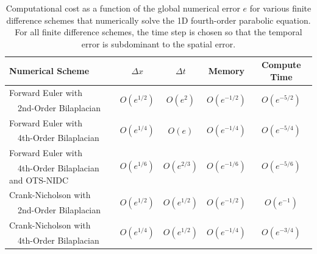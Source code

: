 \documentclass[fleqn,12pt,twoside]{article}
\def\dt{\Delta t}
\def\dx{\Delta x}
\begin{document}
\begin{table}[tb]
\caption{
Computational cost as a function of the global numerical error $e$
for various finite difference schemes that numerically solve the 1D 
fourth-order parabolic equation.  For all finite difference schemes, the 
time step is chosen so that the temporal error is subdominant to the spatial
error.
}
\label{tab:comp_perf_vs_err_4th_order_parabolic} 
\renewcommand{\arraystretch}{1.3}
\centering
\begin{tabular}{lcccc}
  \hline
  {\bf Numerical Scheme} & $\dx$ 
  & $\dt$
  & {\bf Memory}
  & {\bf Compute Time}
  \\
  \hline 
  Forward Euler with 
    & \multirow{2}{*}{$O\left( e^{1/2} \right)$} 
    & \multirow{2}{*}{$O\left( e^{2} \right)$}
    & \multirow{2}{*}{$O\left( e^{-1/2} \right)$} 
    & \multirow{2}{*}{$O\left( e^{-5/2} \right)$} \\
  \ \ 2nd-Order Bilaplacian & & & & \\
  Forward Euler with 
    & \multirow{2}{*}{$O\left( e^{1/4} \right)$}
    & \multirow{2}{*}{$O\left( e \right)$}
    & \multirow{2}{*}{$O\left( e^{-1/4} \right)$} 
    & \multirow{2}{*}{$O\left( e^{-{5/4}} \right)$} \\
  \ \ 4th-Order Bilaplacian & & & & \\
  Forward Euler with 
    & \multirow{2}{*}{$O\left( e^{1/6} \right)$} 
    & \multirow{2}{*}{$O\left( e^{2/3} \right)$} 
    & \multirow{2}{*}{$O\left( e^{-1/6} \right)$} 
    & \multirow{2}{*}{$O\left( e^{-5/6} \right)$} \\ 
  \ \ 4th-Order Bilaplacian and OTS-NIDC & & & & \\
  Crank-Nicholson with 
    & \multirow{2}{*}{$O\left( e^{1/2} \right)$} 
    & \multirow{2}{*}{$O\left( e^{1/2} \right)$} 
    & \multirow{2}{*}{$O\left( e^{-1/2} \right)$} 
    & \multirow{2}{*}{$O\left( e^{-1} \right)$} \\
  \ \ 2nd-Order Bilaplacian & & & & \\
  Crank-Nicholson with 
    & \multirow{2}{*}{$O\left( e^{1/4} \right)$} 
    & \multirow{2}{*}{$O\left( e^{1/2} \right)$} 
    & \multirow{2}{*}{$O\left( e^{-1/4} \right)$} 
    & \multirow{2}{*}{$O\left( e^{-3/4} \right)$} \\
  \ \ 4th-Order Bilaplacian & & & & \\
  \hline
\end{tabular}
\end{table}
\end{document}
